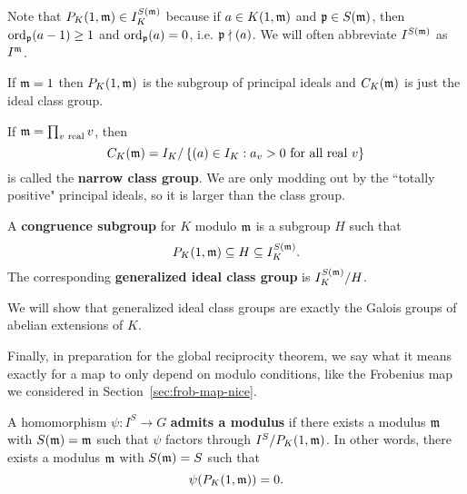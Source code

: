Note that $P_K(1,{\mathfrak{m}})\in I_K^{S(\mathfrak{m})}$ because if $a\in K(1,{\mathfrak{m}})$ and $\mathfrak{p}\in S(\mathfrak{m})$, then $\operatorname{ord}_{\mathfrak{p}}(a-1)\ge 1$ and $\operatorname{ord}_{\mathfrak{p}}(a)=0$, i.e. $\mathfrak{p}\nmid (a)$. We will often abbreviate $I^{S(\mathfrak{m})}$ as $I^{\mathfrak{m}}$.
\begin{ex}
If $\mathfrak{m}=1$ then $P_K(1,{\mathfrak{m}})$ is the subgroup of principal ideals and $C_K(\mathfrak{m})$ is just the ideal class group.

If $\mathfrak{m}=\prod_{v\text{ real}}v$, then
\[C_K(\mathfrak{m})=I_K/\left\{{(a)\in I_K}:{a_v>0\text{ for all real }v}\right\}\]
is called the \textbf{narrow class group}.
We are only modding out by the ``totally positive" principal ideals, so it is larger than the class group.
\end{ex}
\begin{df}
A \textbf{congruence subgroup} for $K$ modulo $\mathfrak{m}$ is a subgroup $H$ such that
\[
P_K(1,{\mathfrak{m}})\subseteq H\subseteq I_K^{S(\mathfrak{m})}.
\]
The corresponding \textbf{generalized ideal class group} is $I_K^{S(\mathfrak{m})}/H$.
\end{df}
We will show that generalized ideal class groups are exactly the Galois groups of abelian extensions of $K$.

Finally, in preparation for the global reciprocity theorem, we say what it means exactly for a map to only depend on modulo conditions, like the Frobenius map we considered in Section~\ref{sec:frob-map-nice}.
\begin{df}
A homomorphism $\psi:I^S\to G$ \textbf{admits a modulus} if  there exists a modulus $\mathfrak{m}$ with $S(\mathfrak{m})=\mathfrak{m}$ such that $\psi$ factors through $I^S/P_K(1,{\mathfrak{m}})$. In other words, there exists a modulus $\mathfrak{m}$ with $S(\mathfrak{m})= S$ such that 
\[
\psi(P_K(1,{\mathfrak{m}}))=0.
\]
\end{df}

